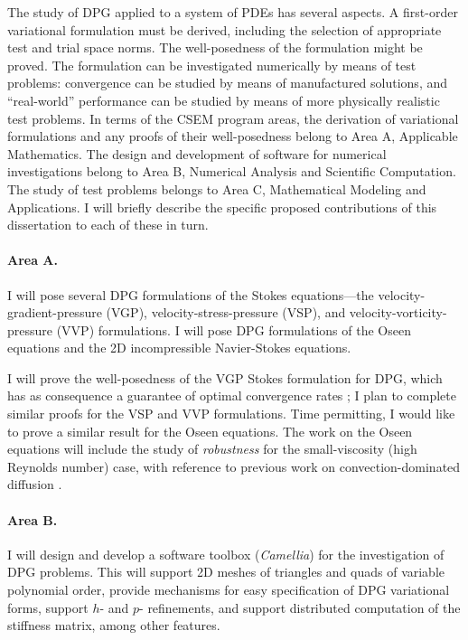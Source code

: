 \documentclass[12pt,c]{article}
\begin{document}
The study of DPG applied to a system of PDEs has several aspects.  A first-order variational formulation must be derived, including the selection of appropriate test and trial space norms.  The well-posedness of the formulation might be proved.  The formulation can be investigated numerically by means of test problems: convergence can be studied by means of manufactured solutions, and ``real-world'' performance can be studied by means of more physically realistic test problems.  In terms of the CSEM program areas, the derivation of variational formulations and any proofs of their well-posedness belong to Area A, Applicable Mathematics.  The design and development of software for numerical investigations belong to Area B, Numerical Analysis and Scientific Computation.  The study of test problems belongs to Area C, Mathematical Modeling and Applications.  I will briefly describe the specific proposed contributions of this dissertation to each of these in turn.

\paragraph{Area A.}  I will pose several DPG formulations of the Stokes equations---the velocity-gradient-pressure (VGP), velocity-stress-pressure (VSP), and velocity-vorticity-pressure (VVP) formulations.  I will pose DPG formulations of the Oseen equations and the 2D incompressible Navier-Stokes equations.

I will prove the well-posedness of the VGP Stokes formulation for DPG, which has as consequence a guarantee of optimal convergence rates \cite{DPGStokes}; I plan to complete similar proofs for the VSP and VVP formulations.  Time permitting, I would like to prove a similar result for the Oseen equations.  The work on the Oseen equations will include the study of \emph{robustness} for the small-viscosity (high Reynolds number) case, with reference to previous work on convection-dominated diffusion \cite{DPG2,DemkowiczHeuer}.

\paragraph{Area B.} I will design and develop a software toolbox (\emph{Camellia}) for the investigation of DPG problems.  This will support 2D meshes of triangles and quads of variable polynomial order, provide mechanisms for easy specification of DPG variational forms, support $h$- and $p$- refinements, and support distributed computation of the stiffness matrix, among other features.
\end{document}
